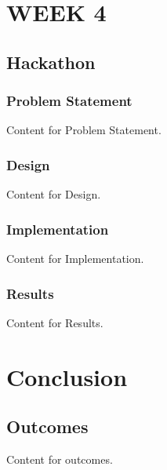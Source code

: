 \chapter{WEEK 4}
\section{Hackathon}
\subsection{Problem Statement}
Content for Problem Statement.
\subsection{Design}
Content for Design.
\subsection{Implementation}
Content for Implementation.
\subsection{Results}
Content for Results.

\chapter{Conclusion}
\section{Outcomes}
Content for outcomes.

